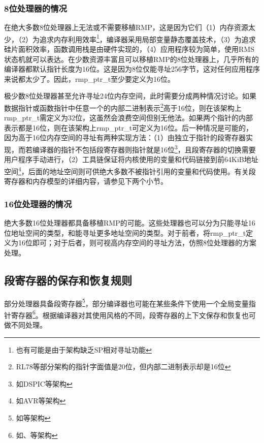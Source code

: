 \subsubsection{8位处理器的情况}\label{subsubsec:the-case-of-8-bit-processors}

在绝大多数8位处理器上无法或不需要移植RMP，这是因为它们（1）内存资源太少，（2）为追求内存利用效率\footnote{也有可能是由于架构缺乏SP相对寻址功能}，编译器采用局部变量静态覆盖技术，（3）为追求硅片面积效率，函数调用栈是由硬件实现的，（4）应用程序较为简单，使用RMS状态机就可以表达。在少数资源丰富且可以移植RMP的8位处理器上，几乎所有的编译器都默认指针长度为16位。这是因为8位仅能寻址256字节，这对任何应用程序来说都太少了。因此，rmp\_ptr\_t至少要定义为16位。

极少数8位处理器甚至允许寻址24位内存空间，此时需要分成两种情况讨论。如果数据指针或函数指针中任意一个的内部二进制表示\footnote{RL78等部分架构的指针字面值是20位，但内部二进制表示却是16位}高于16位，则在该架构上rmp\_ptr\_t需定义为32位，这虽然会浪费空间但别无他法。如果两个指针的内部表示都是16位，则在该架构上rmp\_ptr\_t可定义为16位。后一种情况是可能的，因为高于16位内存空间的寻址有两种实现方法：（1）由独立于指针的段寄存器实现，而若编译器的指针不包括段寄存器则指针就是16位\footnote{如DSPIC等架构}，且段寄存器的切换需要用户程序手动进行，（2）工具链保证将内核使用的变量和代码链接到前64KiB地址空间\footnote{如AVR等架构}，后面的地址空间则可供绝大多数不被指针引用的变量和代码使用。有关段寄存器和内存模型的详细内容，请参见下两个小节。

\subsubsection{16位处理器的情况}\label{subsubsec:the-case-of-16-bit-processors}

绝大多数16位处理器都具备移植RMP的可能。这些处理器也可以分为只能寻址16位地址空间的类型，和能寻址更多地址空间的类型。对于前者，将rmp\_ptr\_t定义为16位即可；对于后者，则可视高内存空间的寻址方法，仿照8位处理器的方案处理。

\subsection{段寄存器的保存和恢复规则}\label{subsec:rules-for-saving-and-restoring-segment-registers}

部分处理器具备段寄存器\footnote{如等架构}，部分编译器也可能在某些条件下使用一个全局变量指针寄存器\footnote{如、等架构}。根据编译器对其使用风格的不同，段寄存器的上下文保存和恢复也可做不同处理。

